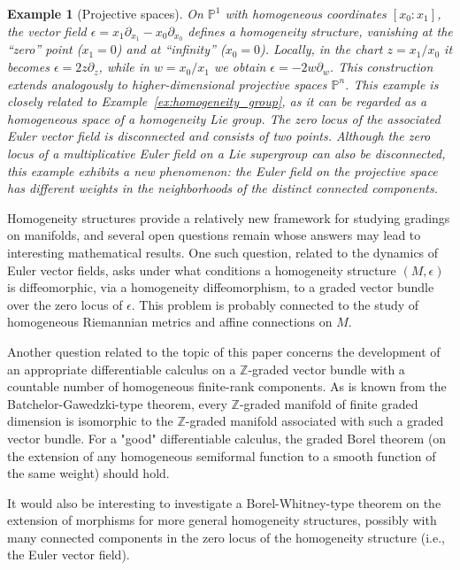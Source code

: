 \documentclass[a4paper,12pt]{amsart}
\newtheorem{example}{Example}
\def\e{\epsilon}
\begin{document}
\begin{example}[Projective spaces]\normalfont
  On $\mathbb{P}^1$ with homogeneous coordinates $[x_0:x_1]$, the vector field $\e = x_1 \partial_{x_1} - x_0 \partial_{x_0}$ defines a homogeneity structure, vanishing at the ``zero'' point ($x_1=0$) and at ``infinity'' ($x_0=0$). Locally, in the chart $z = x_1/x_0$ it becomes $\e = 2z \partial_z$, while in $w = x_0/x_1$ we obtain $\e = -2w \partial_w$. This construction extends analogously to higher-dimensional projective spaces $\mathbb{P}^n$. This example is closely related to Example~\ref{ex:homogeneity_group}, 
as it can be regarded as a homogeneous space of a homogeneity Lie group. 
The zero locus of the associated Euler vector field is disconnected 
and consists of two points. Although the zero locus of a multiplicative Euler field 
on a Lie supergroup can also be disconnected, this example exhibits 
a new phenomenon: the Euler field on the projective space has different 
weights in the neighborhoods of the distinct connected components.
\end{example} 

\smallskip\noindent Homogeneity structures provide a relatively new framework for studying gradings on 
manifolds, and several open questions remain whose answers may lead to interesting 
mathematical results. One such question, related to the dynamics of Euler vector fields, 
asks under what conditions a homogeneity structure $(M, \epsilon)$ is 
diffeomorphic, via a homogeneity diffeomorphism, to a graded vector bundle 
over the zero locus of $\epsilon$. This problem is probably connected to the study of homogeneous Riemannian metrics and affine connections on $M$. 

\smallskip\noindent Another question related to the topic of this paper concerns the development of an appropriate differentiable calculus on a $\mathbb{Z}$-graded vector bundle with a countable number of homogeneous finite-rank components. As is known from the Batchelor-Gawedzki-type theorem, every $\mathbb{Z}$-graded manifold of finite graded dimension is isomorphic to the $\mathbb{Z}$-graded manifold associated with such a graded vector bundle. For a "good" differentiable calculus, the graded Borel theorem (on the extension of any homogeneous semiformal function to a smooth function of the same weight) should hold.

\smallskip\noindent
It would also be interesting to investigate a Borel-Whitney-type theorem on the extension of morphisms for more general homogeneity structures, possibly with many connected components in the zero locus of the homogeneity structure (i.e., the Euler vector field).
\end{document}
